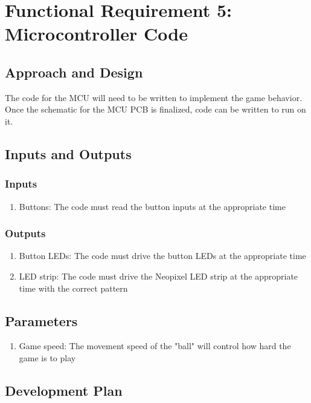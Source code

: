 \documentclass{notes}
\begin{document}
\section{Functional Requirement 5: Microcontroller Code}

\subsection{Approach and Design}

The code for the MCU will need to be written to implement the game behavior.
Once the schematic for the MCU PCB is finalized, code can be written to run on it.

\subsection{Inputs and Outputs}

\subsubsection{Inputs}

\begin{enumerate}
    \item Buttons: The code must read the button inputs at the appropriate time
\end{enumerate}

\subsubsection{Outputs}

\begin{enumerate}
    \item Button LEDs: The code must drive the button LEDs at the appropriate time
    \item LED strip: The code must drive the Neopixel LED strip at the appropriate time with the correct pattern
\end{enumerate}

\subsection{Parameters}

\begin{enumerate}
    \item Game speed: The movement speed of the "ball" will control how hard the game is to play
\end{enumerate}

\subsection{Development Plan}
\end{document}
